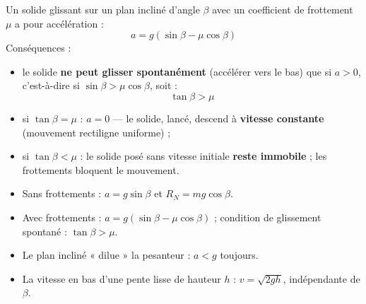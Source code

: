 \documentclass[11pt]{article}
\begin{document}
\begin{propriete}
Un solide glissant sur un plan incliné d'angle $\beta$ avec un coefficient de frottement $\mu$ a pour accélération :
\[
\boxed{\;a = g(\sin\beta - \mu\cos\beta)\;}
\]
Conséquences :
\begin{itemize}
\item le solide \textbf{ne peut glisser spontanément} (accélérer vers le bas) que si $a > 0$, c'est-à-dire si $\sin\beta > \mu\cos\beta$, soit :
\[
\boxed{\;\tan\beta > \mu\;}
\]
\item si $\tan\beta = \mu$ : $a = 0$ — le solide, lancé, descend à \textbf{vitesse constante} (mouvement rectiligne uniforme) ;
\item si $\tan\beta < \mu$ : le solide posé sans vitesse initiale \textbf{reste immobile} ; les frottements bloquent le mouvement.
\end{itemize}
\end{propriete}

\begin{aretenir}
\begin{itemize}
\item Sans frottements : $a = g\sin\beta$ et $R_N = mg\cos\beta$.
\item Avec frottements : $a = g(\sin\beta - \mu\cos\beta)$ ; condition de glissement spontané : $\tan\beta > \mu$.
\item Le plan incliné « dilue » la pesanteur : $a < g$ toujours.
\item La vitesse en bas d'une pente lisse de hauteur $h$ : $v = \sqrt{2gh}$, indépendante de $\beta$.
\end{itemize}
\end{aretenir}
\end{document}
